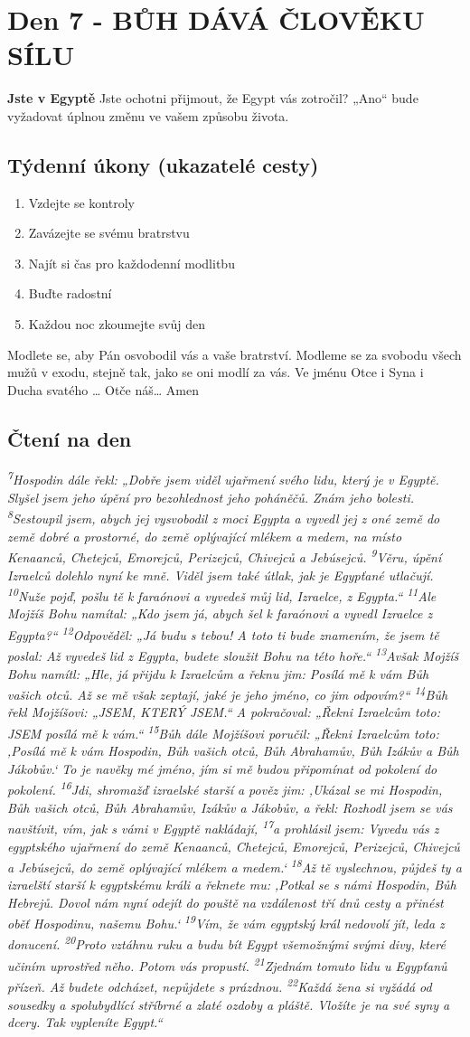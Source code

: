 \documentclass[11pt]{article}
\newcommand{\zacatekPrvniTyden}{
  \textbf{Jste v Egyptě} \newline
  Jste ochotni přijmout, že Egypt vás zotročil? „Ano“ bude vyžadovat úplnou změnu ve vašem způsobu života.

\subsection*{Týdenní úkony (ukazatelé cesty)}
\begin{enumerate}
  \item Vzdejte se kontroly
  \item Zavázejte se svému bratrstvu
  \item Najít si čas pro každodenní modlitbu
  \item Buďte radostní
  \item Každou noc zkoumejte svůj den
\end{enumerate}
Modlete se, aby Pán osvobodil vás a vaše bratrství. \newline
Modleme se za svobodu všech mužů v exodu, stejně tak, jako se oni modlí za vás.\newline
Ve jménu Otce i Syna i Ducha svatého …  Otče náš… Amen
}
\begin{document}
\newpage
\section{Den 7 - BŮH DÁVÁ ČLOVĚKU SÍLU}
\zacatekPrvniTyden
\subsection*{Čtení na den}
\textbf{}
\newline
\textit{
\textsuperscript{7}Hospodin dále řekl: „Dobře jsem viděl ujařmení svého lidu, který je v Egyptě. Slyšel jsem jeho úpění pro bezohlednost jeho poháněčů. Znám jeho bolesti.
\textsuperscript{8}Sestoupil jsem, abych jej vysvobodil z moci Egypta a vyvedl jej z oné země do země dobré a prostorné, do země oplývající mlékem a medem, na místo Kenaanců, Chetejců, Emorejců, Perizejců, Chivejců a Jebúsejců.
\textsuperscript{9}Věru, úpění Izraelců dolehlo nyní ke mně. Viděl jsem také útlak, jak je Egypťané utlačují.
\textsuperscript{10}Nuže pojď, pošlu tě k faraónovi a vyvedeš můj lid, Izraelce, z Egypta.“
\textsuperscript{11}Ale Mojžíš Bohu namítal: „Kdo jsem já, abych šel k faraónovi a vyvedl Izraelce z Egypta?“
\textsuperscript{12}Odpověděl: „Já budu s tebou! A toto ti bude znamením, že jsem tě poslal: Až vyvedeš lid z Egypta, budete sloužit Bohu na této hoře.“
\textsuperscript{13}Avšak Mojžíš Bohu namítl: „Hle, já přijdu k Izraelcům a řeknu jim: Posílá mě k vám Bůh vašich otců. Až se mě však zeptají, jaké je jeho jméno, co jim odpovím?“
\textsuperscript{14}Bůh řekl Mojžíšovi: „JSEM, KTERÝ JSEM.“ A pokračoval: „Řekni Izraelcům toto: JSEM posílá mě k vám.“
\textsuperscript{15}Bůh dále Mojžíšovi poručil: „Řekni Izraelcům toto: ‚Posílá mě k vám Hospodin, Bůh vašich otců, Bůh Abrahamův, Bůh Izákův a Bůh Jákobův.‘ To je navěky mé jméno, jím si mě budou připomínat od pokolení do pokolení.
\textsuperscript{16}Jdi, shromažď izraelské starší a pověz jim: ,Ukázal se mi Hospodin, Bůh vašich otců, Bůh Abrahamův, Izákův a Jákobův, a řekl: Rozhodl jsem se vás navštívit, vím, jak s vámi v Egyptě nakládají,
\textsuperscript{17}a prohlásil jsem: Vyvedu vás z egyptského ujařmení do země Kenaanců, Chetejců, Emorejců, Perizejců, Chivejců a Jebúsejců, do země oplývající mlékem a medem.‘
\textsuperscript{18}Až tě vyslechnou, půjdeš ty a izraelští starší k egyptskému králi a řeknete mu: ‚Potkal se s námi Hospodin, Bůh Hebrejů. Dovol nám nyní odejít do pouště na vzdálenost tří dnů cesty a přinést oběť Hospodinu, našemu Bohu.‘
\textsuperscript{19}Vím, že vám egyptský král nedovolí jít, leda z donucení.
\textsuperscript{20}Proto vztáhnu ruku a budu bít Egypt všemožnými svými divy, které učiním uprostřed něho. Potom vás propustí.
\textsuperscript{21}Zjednám tomuto lidu u Egypťanů přízeň. Až budete odcházet, nepůjdete s prázdnou.
\textsuperscript{22}Každá žena si vyžádá od sousedky a spolubydlící stříbrné a zlaté ozdoby a pláště. Vložíte je na své syny a dcery. Tak vypleníte Egypt.“
}
\end{document}
